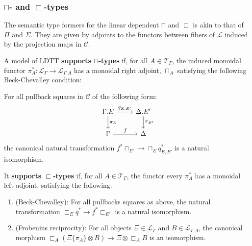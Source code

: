 \documentclass[a4paper,english]{lipics-v2018}
\begin{document}
\subsubsection{$\sqcap$- and $\sqsubset$-types}
The semantic type formers for the linear dependent $\sqcap$ and $\sqsubset$ is akin to that of $\Pi$ and $\Sigma$. They are given by adjoints to the functors between fibers of $\mathcal{L}$ induced by the projection maps in $\mathcal{C}$.
\begin{definition}
  A model of LDTT \textbf{supports $\sqcap$-types} if, for all $A \in \mathcal{T}_{\Gamma}$, the induced monoidal functor $\pi_A^* : \mathcal{L}_{\Gamma} \to \mathcal{L}_{\Gamma.A}$ has a monoidal right adjoint, $\sqcap_A$ satisfying the following Beck-Chevalley condition:

  
  For all pullback squares in $\mathcal{C}$ of the following form:
  \[
      \begin{tikzcd}
    \Gamma.E \ar[d, "\pi_E"] \ar[r, "q_{E, E'}"] & \Delta.E' \ar[d, "\pi_{E'}"] \\
    \Gamma \ar[r, "f"] & \Delta
    \end{tikzcd}
  \]
the canonical natural transformation $f^*\sqcap_{E'} \to \sqcap_{E}q^*_{E, E'}$ is a natural isomorphism.\\
\end{definition}
\begin{definition}
  It \textbf{supports $\sqsubset$-types} if, for all $A \in \mathcal{T}_{\Gamma}$, the functor every $\pi_A^*$ has a monoidal left adjoint, satisfying the following:
  \begin{enumerate}
  \item (Beck-Chevalley): For all pullbacks squares as above, the natural transformation $\sqsubset_Eq^* \to f^*\sqsubset_{E'}$ is a natural isomorphism.
  \item (Frobenius reciprocity): For all objects $\Xi \in \mathcal{L}_{\Gamma}$ and $B \in \mathcal{L}_{\Gamma.A}$, the canonical morphism $\sqsubset_A(\Xi\{\pi_A\} \otimes B) \to \Xi \otimes \sqsubset_AB$ is an isomorphism.
  \end{enumerate}
\end{definition}
\end{document}
